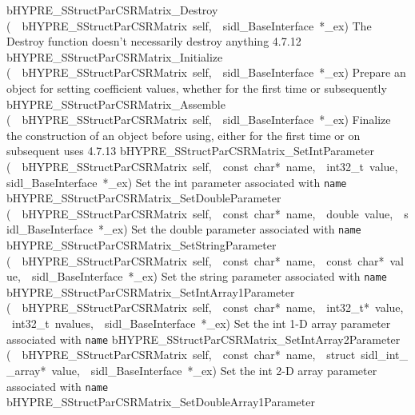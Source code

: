 \documentclass{article}
\begin{document}
\begin{cxxentry}
\begin{cxxentry}
\begin{cxxnames}
        {bHYPRE\_SStructParCSRMatrix\_Destroy}
        {(\ \ bHYPRE\_SStructParCSRMatrix\ self,\ \ sidl\_BaseInterface\ *\_ex)}
        {
The Destroy function doesn't necessarily destroy anything}
        {4.7.12}
        {bHYPRE\_SStructParCSRMatrix\_Initialize}
        {(\ \ bHYPRE\_SStructParCSRMatrix\ self,\ \ sidl\_BaseInterface\ *\_ex)}
        {
Prepare an object for setting coefficient values, whether for
the first time or subsequently}
        {}
\label{cxx.4.7.21}
        {bHYPRE\_SStructParCSRMatrix\_Assemble}
        {(\ \ bHYPRE\_SStructParCSRMatrix\ self,\ \ sidl\_BaseInterface\ *\_ex)}
        {
Finalize the construction of an object before using, either
for the first time or on subsequent uses}
        {4.7.13}
        {bHYPRE\_SStructParCSRMatrix\_SetIntParameter}
        {(\ \ bHYPRE\_SStructParCSRMatrix\ self,\ \ const\ char*\ name,\ \ int32\_t\ value,\ \ sidl\_BaseInterface\ *\_ex)}
        {
Set the int parameter associated with {\tt name}}
        {}
\label{cxx.4.7.22}
        {bHYPRE\_SStructParCSRMatrix\_SetDoubleParameter}
        {(\ \ bHYPRE\_SStructParCSRMatrix\ self,\ \ const\ char*\ name,\ \ double\ value,\ \ sidl\_BaseInterface\ *\_ex)}
        {
Set the double parameter associated with {\tt name}}
        {}
\label{cxx.4.7.23}
        {bHYPRE\_SStructParCSRMatrix\_SetStringParameter}
        {(\ \ bHYPRE\_SStructParCSRMatrix\ self,\ \ const\ char*\ name,\ \ const\ char*\ value,\ \ sidl\_BaseInterface\ *\_ex)}
        {
Set the string parameter associated with {\tt name}}
        {}
\label{cxx.4.7.24}
        {bHYPRE\_SStructParCSRMatrix\_SetIntArray1Parameter}
        {(\ \ bHYPRE\_SStructParCSRMatrix\ self,\ \ const\ char*\ name,\ \ int32\_t*\ value,\ \ int32\_t\ nvalues,\ \ sidl\_BaseInterface\ *\_ex)}
        {
Set the int 1-D array parameter associated with {\tt name}}
        {}
\label{cxx.4.7.25}
        {bHYPRE\_SStructParCSRMatrix\_SetIntArray2Parameter}
        {(\ \ bHYPRE\_SStructParCSRMatrix\ self,\ \ const\ char*\ name,\ \ struct\ sidl\_int\_\_array*\ value,\ \ sidl\_BaseInterface\ *\_ex)}
        {
Set the int 2-D array parameter associated with {\tt name}}
        {}
\label{cxx.4.7.26}
        {bHYPRE\_SStructParCSRMatrix\_SetDoubleArray1Parameter}

\end{cxxnames}
\end{cxxentry}
\end{cxxentry}
\end{document}
